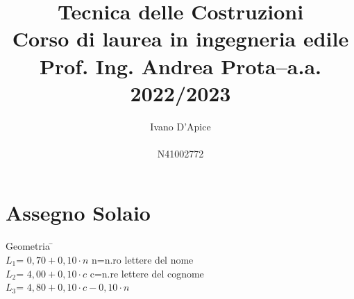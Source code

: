 \documentclass[a4paper,12pt, oneside]{book}
\title{\textbf{Tecnica delle Costruzioni}\\ \textbf{Corso di laurea in ingegneria edile}\\ \textbf{Prof. Ing. Andrea Prota–a.a. 2022/2023}}
\author{Ivano D'Apice\\\\ N41002772}
\date{}
\begin{document}
	\maketitle
	
	
	\newtheorem{teorema}{Teorema}
	\newtheorem{definizione}{Definizione}
	\newtheorem{esempio}{Esempio}
	\newtheorem{corollario}{Corollario}
	\newtheorem{lemma}{Lemma}
	\newtheorem{osservazione}{Osservazione}
	\newtheorem{nota}{Nota}
	\newtheorem{esercizio}{Esercizio}
	\tableofcontents
	\renewcommand{\chaptermark}[1]{%
		\markboth{\chaptername
			\ \thechapter.\ #1}{}}
	\renewcommand{\sectionmark}[1]{\markright{\thesection.\ #1}}
	
	\chapter{Assegno Solaio}
	    
    \begin{tabbing}
	 Geometria \hspace{10em} \= \hspace{1em} \\
	 $L_1$=  $0,70+0,10\cdot n$              \> n=n.ro lettere del nome    \\
	 $L_2$=  $4,00+0,10\cdot c$              \> c=n.re lettere del cognome \\ 
	 $L_3$=  $4,80+0,10\cdot c-0,10\cdot n$  \>                             
    \end{tabbing}	    

	\begin{figure}[H]
		\centering
		\hspace*{-.5cm}
		\caption{}
		\label{fig:traveesss1}
	\end{figure}
	
\end{document}
